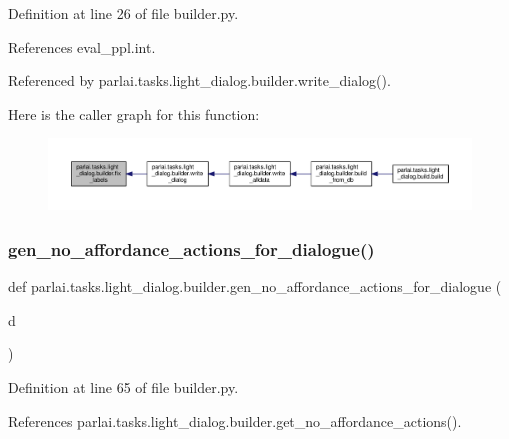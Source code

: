 Definition at line 26 of file builder.\+py.



References eval\+\_\+ppl.\+int.



Referenced by parlai.\+tasks.\+light\+\_\+dialog.\+builder.\+write\+\_\+dialog().

Here is the caller graph for this function\+:
\nopagebreak
\begin{figure}[H]
\begin{center}
\leavevmode
\includegraphics[width=350pt]{namespaceparlai_1_1tasks_1_1light__dialog_1_1builder_aafb760ba2e05ffe5cad429327d0dd347_icgraph}
\end{center}
\end{figure}
\mbox{\label{namespaceparlai_1_1tasks_1_1light__dialog_1_1builder_a537e075c89058b67eb0db786f98491de}} 
\subsubsection{\texorpdfstring{gen\+\_\+no\+\_\+affordance\+\_\+actions\+\_\+for\+\_\+dialogue()}{gen\_no\_affordance\_actions\_for\_dialogue()}}
{\footnotesize\ttfamily def parlai.\+tasks.\+light\+\_\+dialog.\+builder.\+gen\+\_\+no\+\_\+affordance\+\_\+actions\+\_\+for\+\_\+dialogue (\begin{DoxyParamCaption}\item[{}]{d }\end{DoxyParamCaption})}



Definition at line 65 of file builder.\+py.



References parlai.\+tasks.\+light\+\_\+dialog.\+builder.\+get\+\_\+no\+\_\+affordance\+\_\+actions().



